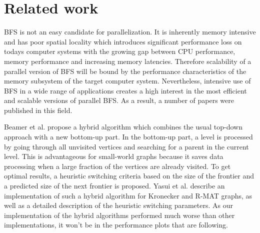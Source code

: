 \documentclass[letterpaper]{article}
\newcommand{\mypar}[1]{{\bf #1.}} %
\begin{document}
	
	
		\section{Related work} \label{sec:rewo} %
		BFS is not an easy candidate for parallelization.
		It is inherently memory intensive and has poor spatial locality which introduces significant performance loss on todays computer systems with the growing gap between CPU performance, memory performance and increasing memory latencies.
		Therefore scalability of a parallel version of BFS will be bound by the performance characteristics of the memory subsystem of the target computer system. 
		Nevertheless, intensive use of BFS in a wide range of applications creates a high interest in the most efficient and scalable versions of parallel BFS.
		As a result, a number of papers were published in this field. 
		
		Beamer et al.\cite{beamer2011searching} propose a hybrid algorithm which combines the usual top-down approach with a new bottom-up part. 
		In the bottom-up part, a level is processed by going through all unvisited vertices and searching for a parent in the current level. 
		This is advantageous for small-world graphs because it saves data processing when a large fraction of the vertices are already visited. 
		To get optimal results, a heuristic switching criteria based  on the size of the frontier and a predicted size of the next frontier is proposed. 
		Yasui et al.\cite{6691600} describe an implementation of such a hybrid algorithm for Kronecker and R-MAT graphs, as well as a detailed description of the heuristic switching parameters.
		As our implementation of the hybrid algorithms performed much worse than other implementations, it won't be in the performance plots that are following.
	
\end{document}
